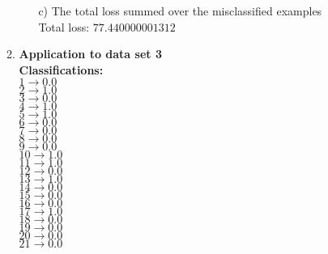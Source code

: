 \begin{enumerate}
\begin{enumerate}
\begin{enumerate}
					\item[c)] The total loss summed over the misclassified examples \\
					\textnormal{Total loss:} \( 77.440000001312 \)
				\end{enumerate}
			\item{\bf Application to data set 3} \\
				\bf{Classifications: } \\
				\( 1 \rightarrow 0.0 \) \\
				\( 2 \rightarrow 1.0 \) \\
				\( 3 \rightarrow 0.0 \) \\
				\( 4 \rightarrow 1.0 \) \\
				\( 5 \rightarrow 1.0 \) \\
				\( 6 \rightarrow 0.0 \) \\
				\( 7 \rightarrow 0.0 \) \\
				\( 8 \rightarrow 0.0 \) \\
				\( 9 \rightarrow 0.0 \) \\
				\( 10 \rightarrow 1.0 \) \\
				\( 11 \rightarrow 1.0 \) \\
				\( 12 \rightarrow 0.0 \) \\
				\( 13 \rightarrow 1.0 \) \\
				\( 14 \rightarrow 0.0 \) \\
				\( 15 \rightarrow 0.0 \) \\
				\( 16 \rightarrow 0.0 \) \\
				\( 17 \rightarrow 1.0 \) \\
				\( 18 \rightarrow 0.0 \) \\
				\( 19 \rightarrow 0.0 \) \\
				\( 20 \rightarrow 0.0 \) \\
				\( 21 \rightarrow 0.0 \) \\
				

\end{enumerate}
\end{enumerate}
